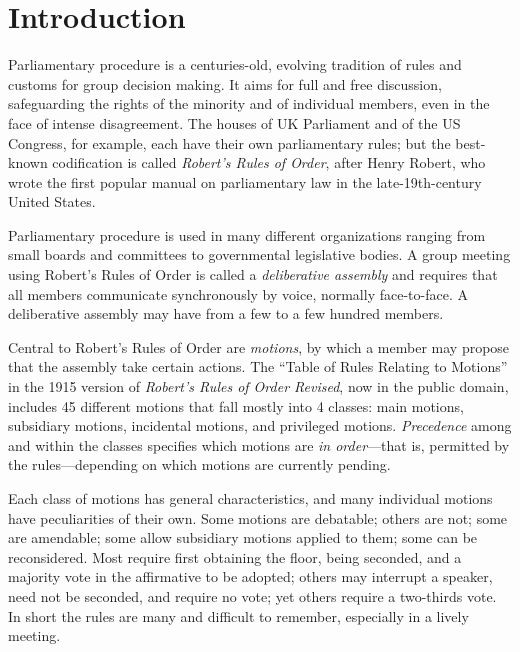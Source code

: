 \documentclass{book}
\begin{document}
\section{Introduction}  %


Parliamentary procedure is a centuries-old, evolving tradition of rules and customs for group decision making. It aims for full and free discussion, safeguarding the rights of the minority and of individual members, even in the face of intense disagreement. The houses of UK Parliament and of the US Congress, for example, each have their own parliamentary rules; but the best-known codification is called \emph{Robert's Rules of Order}, after Henry Robert, who wrote the first popular manual on parliamentary law in the late-19th-century United States.

Parliamentary procedure is used in many different organizations ranging from small boards and committees to governmental legislative bodies. A group meeting using Robert's Rules of Order is called a \emph{deliberative assembly} and requires that all members communicate synchronously by voice, normally face-to-face. A deliberative assembly may have from a few to a few hundred members.

Central to Robert's Rules of Order are \emph{motions}, by which a member may propose that the assembly take certain actions. The ``Table of Rules Relating to Motions'' in the 1915 version of \textit{Robert's Rules of Order Revised}, now in the public domain, includes 45 different motions that fall mostly into 4 classes: main motions, subsidiary motions, incidental motions, and privileged motions. \emph{Precedence} among and within the classes specifies which motions are \emph{in order}---that is, permitted by the rules---depending on which motions are currently pending.

Each class of motions has general characteristics, and many individual motions have peculiarities of their own. Some motions are debatable; others are not; some are amendable; some allow subsidiary motions applied to them; some can be reconsidered. Most require first obtaining the floor, being seconded, and a majority vote in the affirmative to be adopted; others may interrupt a speaker, need not be seconded, and require no vote; yet others require a two-thirds vote. In short the rules are many and difficult to remember, especially in a lively meeting.
\end{document}
